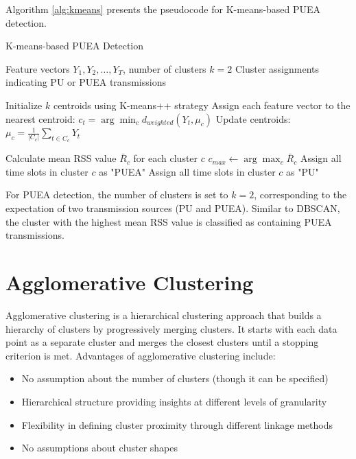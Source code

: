 Algorithm \ref{alg:kmeans} presents the pseudocode for K-means-based PUEA detection.

\begin{algorithm}
\caption{K-means-based PUEA Detection}
\label{alg:kmeans}
\begin{algorithmic}[1]
\Require Feature vectors $Y_1, Y_2, \ldots, Y_T$, number of clusters $k=2$
\Ensure Cluster assignments indicating PU or PUEA transmissions

\State Initialize $k$ centroids using K-means++ strategy
\Repeat
    \State Assign each feature vector to the nearest centroid:
    \State $c_t = \arg\min_{c} d_{weighted}(Y_t, \mu_c)$
    \State Update centroids:
    \State $\mu_c = \frac{1}{|C_c|} \sum_{t \in C_c} Y_t$

\State Calculate mean RSS value $\bar{R}_c$ for each cluster $c$
\State $c_{max} \gets \arg\max_c \bar{R}_c$ 
        \State Assign all time slots in cluster $c$ as "PUEA"
    \Else
        \State Assign all time slots in cluster $c$ as "PU"
    \EndIf
\EndFor

\end{algorithmic}
\end{algorithm}

For PUEA detection, the number of clusters is set to $k=2$, corresponding to the expectation of two transmission sources (PU and PUEA). Similar to DBSCAN, the cluster with the highest mean RSS value is classified as containing PUEA transmissions.

\section{Agglomerative Clustering}

Agglomerative clustering is a hierarchical clustering approach that builds a hierarchy of clusters by progressively merging clusters. It starts with each data point as a separate cluster and merges the closest clusters until a stopping criterion is met. Advantages of agglomerative clustering include:

\begin{itemize}
    \item No assumption about the number of clusters (though it can be specified)
    \item Hierarchical structure providing insights at different levels of granularity
    \item Flexibility in defining cluster proximity through different linkage methods
    \item No assumptions about cluster shapes
\end{itemize}

